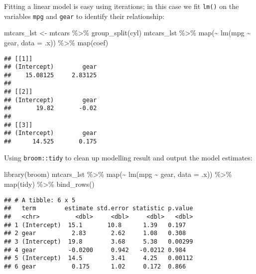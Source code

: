 \documentclass[
]{book}
\newenvironment{Shaded}{\begin{snugshade}}{\end{snugshade}}
\newcommand{\AttributeTok}[1]{\textcolor[rgb]{0.77,0.63,0.00}{#1}}
\newcommand{\FunctionTok}[1]{\textcolor[rgb]{0.00,0.00,0.00}{#1}}
\newcommand{\NormalTok}[1]{#1}
\newcommand{\OtherTok}[1]{\textcolor[rgb]{0.56,0.35,0.01}{#1}}
\newcommand{\SpecialCharTok}[1]{\textcolor[rgb]{0.00,0.00,0.00}{#1}}
\begin{document}
Fitting a linear model is easy using iterations; in this case we fit \texttt{lm()} on the variables \texttt{mpg} and \texttt{gear} to identify their relationship:

\begin{Shaded}
\begin{Highlighting}[]
\NormalTok{mtcars\_lst }\OtherTok{\textless{}{-}}\NormalTok{ mtcars }\SpecialCharTok{\%\textgreater{}\%} \FunctionTok{group\_split}\NormalTok{(cyl)}
\NormalTok{mtcars\_lst }\SpecialCharTok{\%\textgreater{}\%} 
  \FunctionTok{map}\NormalTok{(}\SpecialCharTok{\textasciitilde{}} \FunctionTok{lm}\NormalTok{(mpg }\SpecialCharTok{\textasciitilde{}}\NormalTok{ gear, }\AttributeTok{data =}\NormalTok{ .x)) }\SpecialCharTok{\%\textgreater{}\%}
  \FunctionTok{map}\NormalTok{(coef)}
\end{Highlighting}
\end{Shaded}

\begin{verbatim}
## [[1]]
## (Intercept)        gear 
##    15.08125     2.83125 
## 
## [[2]]
## (Intercept)        gear 
##       19.82       -0.02 
## 
## [[3]]
## (Intercept)        gear 
##      14.525       0.175
\end{verbatim}

Using \texttt{broom::tidy} to clean up modelling result and output the model estimates:

\begin{Shaded}
\begin{Highlighting}[]
\FunctionTok{library}\NormalTok{(broom)}
\NormalTok{mtcars\_lst }\SpecialCharTok{\%\textgreater{}\%}
  \FunctionTok{map}\NormalTok{(}\SpecialCharTok{\textasciitilde{}} \FunctionTok{lm}\NormalTok{(mpg }\SpecialCharTok{\textasciitilde{}}\NormalTok{ gear, }\AttributeTok{data =}\NormalTok{ .x)) }\SpecialCharTok{\%\textgreater{}\%}
  \FunctionTok{map}\NormalTok{(tidy) }\SpecialCharTok{\%\textgreater{}\%}
  \FunctionTok{bind\_rows}\NormalTok{()}
\end{Highlighting}
\end{Shaded}

\begin{verbatim}
## # A tibble: 6 x 5
##   term        estimate std.error statistic p.value
##   <chr>          <dbl>     <dbl>     <dbl>   <dbl>
## 1 (Intercept)  15.1       10.8      1.39   0.197  
## 2 gear          2.83       2.62     1.08   0.308  
## 3 (Intercept)  19.8        3.68     5.38   0.00299
## 4 gear         -0.0200     0.942   -0.0212 0.984  
## 5 (Intercept)  14.5        3.41     4.25   0.00112
## 6 gear          0.175      1.02     0.172  0.866
\end{verbatim}
\end{document}
